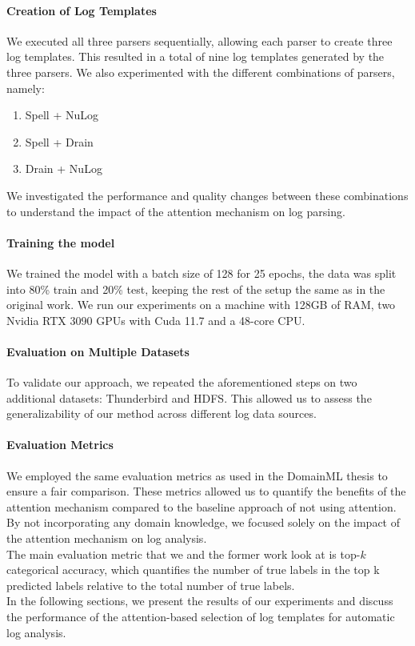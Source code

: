 \paragraph{Creation of Log Templates}
We executed all three parsers sequentially, allowing each parser to create three log templates. This resulted in a total of nine log templates generated by the three parsers. We also experimented with the different combinations of parsers, namely:
\begin{enumerate}
    \item Spell + NuLog
    \item Spell + Drain
    \item Drain + NuLog
\end{enumerate}


We investigated the performance and quality changes between these combinations to understand the impact of the attention mechanism on log parsing.


\paragraph{Training the model}
We trained the model with a batch size of 128 for 25 epochs, the data was split into 80\% train and 20\% test, keeping the rest of the setup the same as in the original work\cite{witterauf2021domainml}. We run our experiments on a machine with 128GB of RAM, two Nvidia RTX 3090 GPUs with Cuda 11.7 and a 48-core CPU. 
\paragraph{Evaluation on Multiple Datasets}
To validate our approach, we repeated the aforementioned steps on two additional datasets: Thunderbird and HDFS. This allowed us to assess the generalizability of our method across different log data sources.
\paragraph{Evaluation Metrics}

We employed the same evaluation metrics as used in the DomainML thesis to ensure a fair comparison. These metrics allowed us to quantify the benefits of the attention mechanism compared to the baseline approach of not using attention. By not incorporating any domain knowledge, we focused solely on the impact of the attention mechanism on log analysis.\\

The main evaluation metric that we and the former work look at is top-$k$ categorical accuracy, which quantifies the number of true labels in the top k predicted labels relative to the total number of true labels.\\

In the following sections, we present the results of our experiments and discuss the performance of the attention-based selection of log templates for automatic log analysis.

